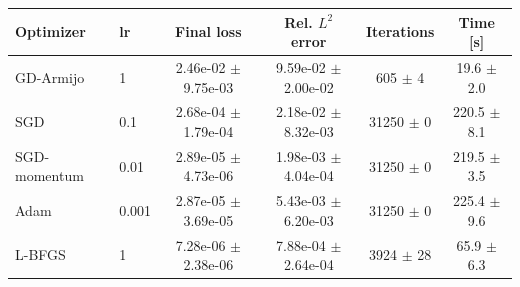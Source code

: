 \begin{tabular}{llcccc}
\toprule
Optimizer & lr & Final loss & Rel. $L^2$ error & Iterations & Time [s] \\
\midrule
GD-Armijo & 1 & 2.46e-02 $\pm$ 9.75e-03 & 9.59e-02 $\pm$ 2.00e-02 & 605 $\pm$ 4 & 19.6 $\pm$ 2.0 \\
SGD & 0.1 & 2.68e-04 $\pm$ 1.79e-04 & 2.18e-02 $\pm$ 8.32e-03 & 31250 $\pm$ 0 & 220.5 $\pm$ 8.1 \\
SGD-momentum & 0.01 & 2.89e-05 $\pm$ 4.73e-06 & 1.98e-03 $\pm$ 4.04e-04 & 31250 $\pm$ 0 & 219.5 $\pm$ 3.5 \\
Adam & 0.001 & 2.87e-05 $\pm$ 3.69e-05 & 5.43e-03 $\pm$ 6.20e-03 & 31250 $\pm$ 0 & 225.4 $\pm$ 9.6 \\
L-BFGS & 1 & 7.28e-06 $\pm$ 2.38e-06 & 7.88e-04 $\pm$ 2.64e-04 & 3924 $\pm$ 28 & 65.9 $\pm$ 6.3 \\
\bottomrule
\end{tabular}